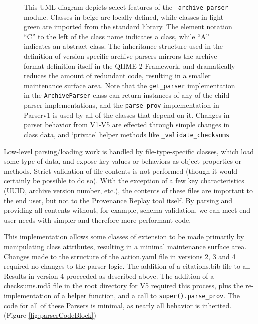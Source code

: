 \begin{figure}[htp]
\begin{minipage}[c]{0.5\textwidth}
    \end{minipage}\hfill
    \begin{minipage}[c]{0.45\textwidth}
\caption[UML Class diagram of the Version-specific Archive Parsers]%
{This UML diagram depicts select features of the \texttt{\_archive\_parser} module. Classes
in beige are locally defined, while classes in light green are imported from the
standard library. The element notation “C” to the left of the class name
indicates a class, while “A” indicates an abstract class. The inheritance
structure used in the definition of version-specific archive parsers mirrors the
archive format definition itself in the QIIME 2 Framework, and dramatically
reduces the amount of redundant code, resulting in a smaller maintenance surface
area. Note that the \texttt{get\_parser} implementation in the \texttt{ArchiveParser} class can
return instances of any of the child parser implementations, and the \texttt{parse\_prov}
implementation in Parserv1 is used by all of the classes that depend on it.
Changes in parser behavior from V1-V5 are effected through simple changes in
class data, and ‘private’ helper methods like \texttt{\_validate\_checksums}}
    \end{minipage}
    \label{fig:archiveParsersUML}
\end{figure}

Low-level parsing/loading work is handled by file-type-specific classes, which
load some type of data, and expose key values or behaviors as object properties
or methods. Strict validation of file contents is not performed (though it would
certainly be possible to do so). With the exception of a few key characteristics
(UUID, archive version number, etc.), the contents of these files are important
to the end user, but not to the Provenance Replay tool itself. By parsing and
providing all contents without, for example, schema validation, we can meet end
user needs with simpler and therefore more performant code.

This implementation allows some classes of extension to be made primarily by
manipulating class attributes, resulting in a minimal maintenance surface area.
Changes made to the structure of the action.yaml file in versions 2, 3 and 4
required no changes to the parser logic. The addition of a citations.bib file to
all Results in version 4 proceeded as described above. The addition of a
checksums.md5 file in the root directory for V5 required this process, plus the
re-implementation of a helper function, and a call to \texttt{super().parse\_prov}. The
code for all of these Parsers is minimal, as nearly all behavior is inherited. 
(Figure \ref{fig:parserCodeBlock})

